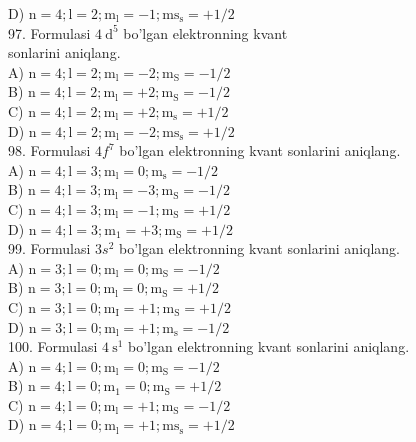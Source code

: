 D) $\mathrm{n}=4 ; \mathrm{l}=2 ; \mathrm{m}_{\mathrm{l}}=-1 ; \mathrm{ms}_{\mathrm{s}}=+1 / 2$\\
97. Formulasi $4 \mathrm{~d}^{5}$ bo'lgan elektronning kvant\\
sonlarini aniqlang.\\
A) $\mathrm{n}=4 ; \mathrm{l}=2 ; \mathrm{m}_{\mathrm{l}}=-2 ; \mathrm{m}_{\mathrm{S}}=-1 / 2$\\
B) $\mathrm{n}=4 ; \mathrm{l}=2 ; \mathrm{m}_{\mathrm{l}}=+2 ; \mathrm{m}_{\mathrm{S}}=-1 / 2$\\
C) $\mathrm{n}=4 ; \mathrm{l}=2 ; \mathrm{m}_{\mathrm{l}}=+2 ; \mathrm{m}_{\mathrm{s}}=+1 / 2$\\
D) $\mathrm{n}=4 ; \mathrm{l}=2 ; \mathrm{m}_{\mathrm{l}}=-2 ; \mathrm{ms}_{\mathrm{s}}=+1 / 2$\\
98. Formulasi $4 f^{7}$ bo'lgan elektronning kvant sonlarini aniqlang.\\
A) $\mathrm{n}=4 ; \mathrm{l}=3 ; \mathrm{m}_{\mathrm{l}}=0 ; \mathrm{m}_{\mathrm{s}}=-1 / 2$\\
B) $\mathrm{n}=4 ; \mathrm{l}=3 ; \mathrm{m}_{\mathrm{l}}=-3 ; \mathrm{m}_{\mathrm{S}}=-1 / 2$\\
C) $\mathrm{n}=4 ; \mathrm{l}=3 ; \mathrm{m}_{\mathrm{l}}=-1 ; \mathrm{m}_{\mathrm{S}}=+1 / 2$\\
D) $\mathrm{n}=4 ; \mathrm{l}=3 ; \mathrm{m}_{1}=+3 ; \mathrm{m}_{\mathrm{S}}=+1 / 2$\\
99. Formulasi $3 s^{2}$ bo'lgan elektronning kvant sonlarini aniqlang.\\
A) $\mathrm{n}=3 ; \mathrm{l}=0 ; \mathrm{m}_{\mathrm{l}}=0 ; \mathrm{m}_{\mathrm{S}}=-1 / 2$\\
B) $\mathrm{n}=3 ; \mathrm{l}=0 ; \mathrm{m}_{\mathrm{l}}=0 ; \mathrm{m}_{\mathrm{S}}=+1 / 2$\\
C) $\mathrm{n}=3 ; \mathrm{l}=0 ; \mathrm{m}_{\mathrm{I}}=+1 ; \mathrm{m}_{\mathrm{S}}=+1 / 2$\\
D) $\mathrm{n}=3 ; \mathrm{l}=0 ; \mathrm{m}_{\mathrm{l}}=+1 ; \mathrm{m}_{\mathrm{s}}=-1 / 2$\\
100. Formulasi $4 \mathrm{~s}^{1}$ bo'lgan elektronning kvant sonlarini aniqlang.\\
A) $\mathrm{n}=4 ; \mathrm{l}=0 ; \mathrm{m}_{\mathrm{l}}=0 ; \mathrm{m}_{\mathrm{S}}=-1 / 2$\\
B) $\mathrm{n}=4 ; \mathrm{l}=0 ; \mathrm{m}_{1}=0 ; \mathrm{m}_{\mathrm{S}}=+1 / 2$\\
C) $\mathrm{n}=4 ; \mathrm{l}=0 ; \mathrm{m}_{\mathrm{l}}=+1 ; \mathrm{m}_{\mathrm{S}}=-1 / 2$\\
D) $\mathrm{n}=4 ; \mathrm{l}=0 ; \mathrm{m}_{\mathrm{l}}=+1 ; \mathrm{ms}_{\mathrm{s}}=+1 / 2$